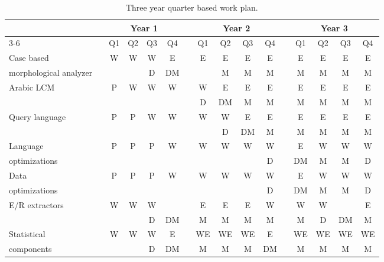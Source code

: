 \documentclass[12pt]{article}
\begin{document}
\begin{table}[bt]
\centering
\caption{Three year quarter based work plan.}
\small
\begin{tabular}{lp{.1cm}ccccp{.1cm}ccccp{.1cm}cccc} \\
& & \multicolumn{4}{c}{Year 1} & & \multicolumn{4}{c}{Year 2} & & \multicolumn{4}{c}{Year 3} \\ \cline{3-6} \cline{8-11} \cline{13-16} %
& & Q1 & Q2 & Q3 & Q4 & & Q1 & Q2 & Q3 & Q4 & & Q1 & Q2 & Q3 & Q4 \\ \bottomrule

Case based & & 
W & W & W & E & & E & E & E & E & & E & E & E & E \\ 
morphological analyzer & & 
 &  & D & DM & &   & M & M & M & & M & M & M & M \\  \hline

\multirow{2}{*}{Arabic LCM} & & 
P & W & W & W & & W & E & E & E & & E & E & E & E \\ 
& & 
 &  &  &  & & D & DM & M & M & & M & M & M & M \\ \hline

\multirow{2}{*}{Query language} & & 
P & P & W & W & & W & W & E & E & & E & E & E & E \\ 
& & 
  &  &  &  & &  & D & DM & M & & M & M & M & M \\ \hline

Language & & 
P & P & P & W & & W & W & W & W & & E & W & W & W \\ 
optimizations & & 
 &  &  &  & &  &  &  & D & & DM & M & M & D \\ \hline

Data  & & 
P & P & P & W & & W & W & W & W & & E & W & W & W \\ 
optimizations & & 
 &  &  &  & &  &  &  & D & & DM & M & M & D \\ \hline

\multirow{2}{*}{E/R extractors} & & 
W & W & W &  & & E & E & E & W & & W & W &  & E \\ 
& & 
 &  & D & DM & & M & M & M & M & & M & D & DM & M \\ \hline

Statistical & & 
W & W & W & E & & WE & WE & WE & E & & WE & WE & WE & WE \\ 
components & & 
 &  & D & DM & & M & M & M & DM & & M & M & M & M \\ \hline


\end{tabular}
\end{table}
\end{document}

